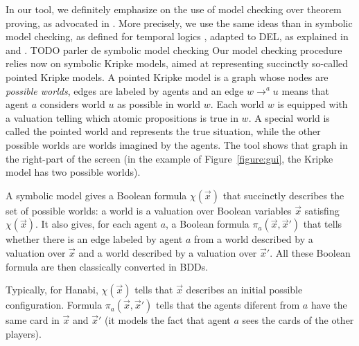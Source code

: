 In our tool, we definitely emphasize on the use of model checking over theorem proving, as advocated in \cite{DBLP:conf/kr/HalpernV91}. More precisely, we use the same ideas than in symbolic model checking, as defined for temporal logics \cite{DBLP:conf/lics/BurchCMDH90}, adapted to DEL, as explained in \cite{DBLP:conf/atal/CharrierS17} and \cite{DBLP:conf/aiml/CharrierS18}. TODO parler de symbolic model checking Our model checking procedure relies now on symbolic Kripke models, aimed at representing succinctly so-called pointed Kripke models. A pointed Kripke model is a graph whose nodes are \emph{possible worlds}, edges are labeled by agents and an edge $w \rightarrow^a u$ means that agent $a$ considers world $u$ as possible in world $w$. Each world $w$ is equipped with a valuation telling which atomic propositions is true in $w$. A special world is called the pointed world and represents the true situation, while the other possible worlds are worlds imagined by the agents.
The tool shows that graph in the right-part of the screen (in the example of Figure~\ref{figure:gui}, the Kripke model has two possible worlds). 


\newcommand{\succinctsetworlds}{\chi}
\newcommand{\succinctrelation}[1]{\pi_{#1}}
 A symbolic model gives a Boolean formula $\succinctsetworlds(\vec x)$ that succinctly  describes the set of possible worlds: a world is a valuation over Boolean variables $\vec x$ satisfing $\succinctsetworlds(\vec x)$. It also gives, for each agent $a$, a Boolean formula $\succinctrelation a(\vec x, \vec x')$ that tells whether there is an edge labeled by agent $a$ from a world described by a valuation over $\vec x$ and  a world described by a valuation over $\vec x'$. All these Boolean formula are then classically converted in BDDs.%


Typically, for Hanabi, $\succinctsetworlds(\vec x)$ tells that $\vec x$ describes an initial possible configuration. Formula $\succinctrelation a(\vec x, \vec x')$ tells that the agents diferent from $a$ have the same card in $\vec x$ and $\vec x'$ (it models the fact that agent $a$ sees the cards of the other players).

